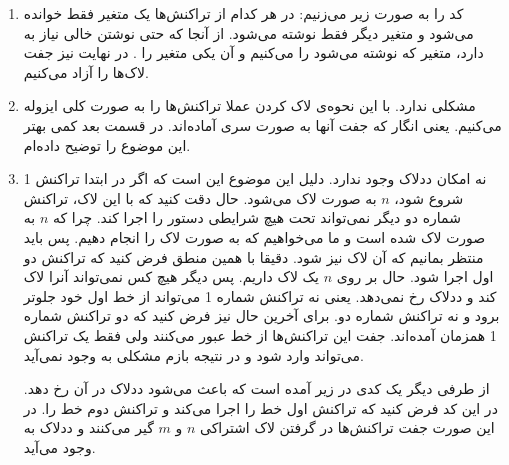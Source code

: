 \begin{enumerate}
    \item کد را به صورت زیر می‌زنیم:
    در هر کدام از تراکنش‌ها یک متغیر فقط خوانده می‌شود و متغیر دیگر فقط نوشته می‌شود. از آنجا که حتی نوشتن
    خالی نیاز به
    دارد، متغیر که نوشته می‌شود را
    می‌کنیم و آن یکی متغیر را
    .
    در نهایت نیز جفت لاک‌ها را آزاد می‌کنیم.
    \item مشکلی ندارد. با این نحوه‌ی لاک کردن عملا تراکنش‌ها را به صورت کلی ایزوله می‌کنیم. یعنی انگار که
    جفت آنها به صورت سری آماده‌اند. در قسمت بعد کمی بهتر این موضوع را توضیح داده‌ام.
    \item نه امکان ددلاک وجود ندارد.
    دلیل این موضوع این است که اگر در ابتدا تراکنش 1 شروع شود،
    $n$
    به صورت
    لاک می‌شود. حال دقت کنید که با این لاک، تراکنش شماره دو دیگر نمی‌تواند تحت هیچ شرایطی دستور
    را اجرا کند. چرا که
    $n$
    به صورت
    لاک شده است و ما می‌خواهیم که به صورت
    لاک را انجام دهیم. پس باید منتظر بمانیم که آن لاک
    نیز
    شود.
    دقیقا با همین منطق فرض کنید که تراکنش دو اول اجرا شود. حال بر روی
    $n$
    یک لاک
    داریم. پس دیگر هیچ کس نمی‌تواند آنرا لاک کند و ددلاک رخ نمی‌دهد. یعنی نه تراکنش شماره 1 می‌تواند از خط
    اول خود جلوتر برود و نه تراکنش شماره دو.
    برای آخرین حال نیز فرض کنید که دو تراکنش شماره 1 همزمان آمده‌اند. جفت این تراکنش‌ها از خط
    عبور می‌کنند ولی فقط یک تراکنش می‌تواند وارد
    شود و در نتیجه بازم مشکلی به وجود نمی‌آید.

    از طرفی دیگر یک کدی در زیر آمده است که باعث می‌شود ددلاک در آن رخ دهد.
    \noindent
    در این کد فرض کنید که تراکنش اول خط
    را اجرا می‌کند و تراکنش دوم خط
    را. در این صورت جفت تراکنش‌ها در گرفتن لاک اشتراکی
    $n$ و $m$
    گیر می‌کنند و ددلاک به وجود می‌آید.
\end{enumerate}



